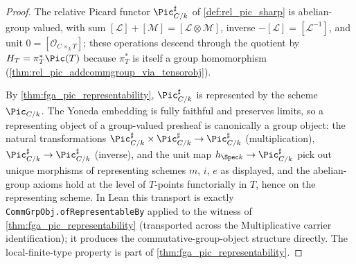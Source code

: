 \begin{proof}
\leanok
  The relative Picard functor \(\Pic^\sharp_{C/k}\) of
  \cref{def:rel_pic_sharp} is abelian-group valued, with sum
  \([\mathcal{L}] + [\mathcal{M}] = [\mathcal{L} \otimes \mathcal{M}]\),
  inverse \(-[\mathcal{L}] = [\mathcal{L}^{-1}]\), and unit
  \(0 = [\mathcal{O}_{C \times_k T}]\); these operations descend through
  the quotient by \(H_T = \pi_T^*\Pic(T)\) because \(\pi_T^*\) is itself a
  group homomorphism (\cref{thm:rel_pic_addcommgroup_via_tensorobj}).

  By \cref{thm:fga_pic_representability}, \(\Pic^\sharp_{C/k}\) is
  represented by the scheme \(\Pic_{C/k}\). The Yoneda embedding is fully
  faithful and preserves limits, so a representing object of a
  group-valued presheaf is canonically a group object: the natural
  transformations
  $\Pic^\sharp_{C/k} \times \Pic^\sharp_{C/k} \to \Pic^\sharp_{C/k}$
  (multiplication), \(\Pic^\sharp_{C/k} \to \Pic^\sharp_{C/k}\) (inverse),
  and the unit map \(h_{\Spec k} \to \Pic^\sharp_{C/k}\) pick out unique
  morphisms of representing schemes \(m\), \(i\), \(e\) as displayed, and
  the abelian-group axioms hold at the level of \(T\)-points functorially
  in \(T\), hence on the representing scheme. In Lean this transport is
  exactly \texttt{CommGrpObj.ofRepresentableBy} applied to the witness of
  \cref{thm:fga_pic_representability} (transported across the
  \(\mathrm{Multiplicative}\) carrier identification); it produces the
  commutative-group-object structure directly. The local-finite-type
  property is part of \cref{thm:fga_pic_representability}.
\end{proof}

